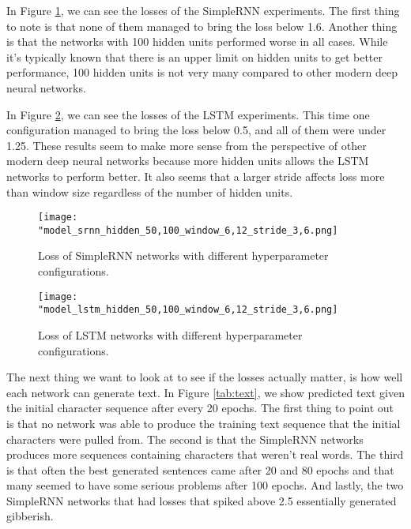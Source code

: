 \documentclass[12pt]{article}
\begin{document}
In Figure \ref{fig:srnn}, we can see the losses of the SimpleRNN experiments.
The first thing to note is that none of them managed to bring the loss below 1.6.
Another thing is that the networks with 100 hidden units performed worse in all cases.
While it's typically known that there is an upper limit on hidden units to get better performance, 100 hidden units is not very many compared to other modern deep neural networks.

In Figure \ref{fig:lstm}, we can see the losses of the LSTM experiments.
This time one configuration managed to bring the loss below 0.5, and all of them were under 1.25.
These results seem to make more sense from the perspective of other modern deep neural networks because more hidden units allows the LSTM networks to perform better.
It also seems that a larger stride affects loss more than window size regardless of the number of hidden units.

\begin{figure}[!htb]
  \centering
  \texttt{[image: "model\_srnn\_hidden\_50,100\_window\_6,12\_stride\_3,6.png]}
  \caption{Loss of SimpleRNN networks with different hyperparameter configurations.}
  \label{fig:srnn}
\end{figure}

\begin{figure}[!htb]
  \centering
  \texttt{[image: "model\_lstm\_hidden\_50,100\_window\_6,12\_stride\_3,6.png]}
  \caption{Loss of LSTM networks with different hyperparameter configurations.}
  \label{fig:lstm}
\end{figure}

The next thing we want to look at to see if the losses actually matter, is how well each network can generate text.
In Figure \ref{tab:text}, we show predicted text given the initial character sequence after every 20 epochs.
The first thing to point out is that no network was able to produce the training text sequence that the initial characters were pulled from.
The second is that the SimpleRNN networks produces more sequences containing characters that weren't real words.
The third is that often the best generated sentences came after 20 and 80 epochs and that many seemed to have some serious problems after 100 epochs.
And lastly, the two SimpleRNN networks that had losses that spiked above 2.5 essentially generated gibberish.
\end{document}
